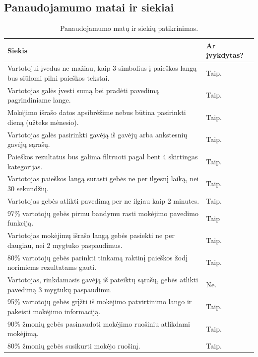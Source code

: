 \documentclass[oneside]{VUMIFPSkursinis}
\begin{document}
\subsection{Panaudojamumo matai ir siekiai}
\begin{center}
	\begin{table}[!ht]
	\caption{Panaudojamumo matų ir siekių patikrinimas.}
    \begin{tabular}{ |p{12cm}| p{3cm} |}
    \hline
	Siekis & Ar įvykdytas? \\ \hline
	Vartotojui įvedus ne mažiau, kaip 3 simbolius į paieškos langą bus siūlomi pilni paieškos tekstai. & Taip. \\ \hline
	Vartotojas galės įvesti sumą bei pradėti pavedimą pagrindiniame lange. & Taip. \\ \hline
	Mokėjimo išrašo datos apsibrėžime nebus būtina pasirinkti dieną (užteks mėnesio). & Taip. \\ \hline
	Vartotojas galės pasirinkti gavėją iš gavėjų arba ankstesnių gavėjų sąrašų. & Taip. \\ \hline
	Paieškos rezultatus bus galima filtruoti pagal bent 4 skirtingas kategorijas. & Taip. \\ \hline
	Vartotojas paieškos langą surasti gebės ne per ilgesnį laiką, nei 30 sekundžių. & Taip. \\ \hline
	Vartotojas gebės atlikti pavedimą per ne ilgiau kaip 2 minutes. & Taip. \\ \hline
	97\% vartotojų gebės pirmu bandymu rasti mokėjimo pavedimo funkciją. & Taip \\ \hline
	Vartotojas mokėjimų išrašo langą gebės pasiekti ne per daugiau, nei 2 mygtuko paspaudimus. & Taip. \\ \hline
	80\% vartotojų gebės parinkti tinkamą raktinį paieškos žodį norimiems rezultatams gauti. & Taip. \\ \hline
	Vartotojas, rinkdamasis gavėją iš pateiktų sąrašų, gebės atlikti pavedimą 3 mygtukų paspaudimu. & Ne. \\ \hline
	95\% vartotojų gebės grįžti iš mokėjimo patvirtinimo lango ir pakeisti mokėjimo informaciją. & Taip. \\ \hline
	90\% žmonių gebės pasinaudoti mokėjimo ruošiniu atlikdami mokėjimą. & Taip. \\ \hline
	80\% žmonių gebės susikurti mokėjo ruošinį. & Taip. \\ \hline

		\end{tabular}
	\end{table}
\end{center}
\end{document}
